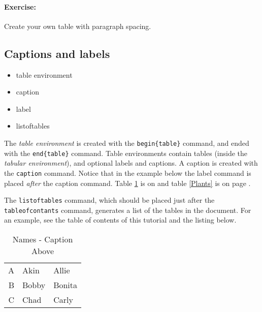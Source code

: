         \paragraph{Exercise:} Create your own table with paragraph spacing.

        \subsection{Captions and labels}
        \label{Captions and labels}
        
        \begin{framed}
            \begin{itemize}
                \item{table environment}
                \item{caption}
                \item{label}
                \item{listoftables}
            \end{itemize}
        \end{framed}

        The \textit{table environment} is created with the \texttt{begin\{table\}} command, and ended with the \texttt{end\{table\}} command. Table environments contain tables (inside the \textit{tabular environment}), and optional labels and captions. A caption is created with the \texttt{caption} command. Notice that in the example below the label command is placed \textit{after} the caption command. Table \ref{Names} is on \pageref{Names} and table \ref{Plants} is on page \pageref{Plants}.

        The \texttt{listoftables} command, which should be placed just after the \texttt{tableofcontants} command, generates a list of the tables in the document. For an example, see the table of contents of this tutorial and the listing below.

    \begin{table}
    \caption{Names - Caption Above}
    \label{Names}
        \begin{tabular}{r | l l}
            \hline
            A & Akin & Allie \\
            B & Bobby & Bonita \\
            C & Chad & Carly \\
            \hline
        \end{tabular}
    \end{table}

